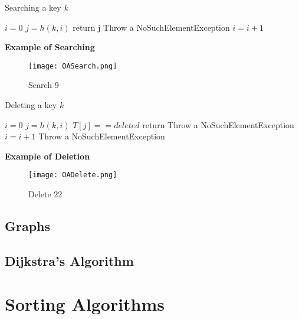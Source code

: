 \documentclass[10pt, 
a4paper, 
oneside, 
headinclude, footinclude, 
BCOR5mm]
{scrartcl}
\begin{document}
\begin{algorithm}
    \caption{Searching a key \textit{k}}
    $i = 0$\;
        {$j=h(k,i)$\;
            {return j\;}
            {Throw a NoSuchElementException\;}
        $i=i+1$\;}
\end{algorithm}
\newpage
\textbf{Example of Searching}
\begin{figure}[H]
    \begin{center}
        \texttt{[image: OASearch.png]}
        \caption{Search 9}
    \end{center}   
\end{figure}

\begin{algorithm}
    \caption{Deleting a key \textit{k}}
    $i = 0$\;
        {$j=h(k,i)$\;
            {$T[j]==deleted$\;
            return\;}
            {Throw a NoSuchElementException\;}
        $i=i+1$\;}
    Throw a NoSuchElementException\;
\end{algorithm}
\newpage
\textbf{Example of Deletion}
\begin{figure}[H]
    \begin{center}
        \texttt{[image: OADelete.png]}
        \caption{Delete 22}
    \end{center}   
\end{figure}

\newpage
\subsection{Graphs}

\newpage
\subsection{Dijkstra's Algorithm}

\newpage

\section{Sorting Algorithms}
\end{document}
